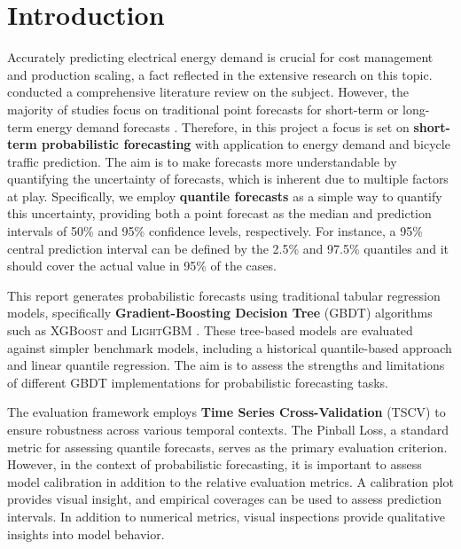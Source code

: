 \section{Introduction}
\label{ch:Introduction}

Accurately predicting electrical energy demand is crucial for cost management and production scaling, a fact reflected in the extensive research on this topic. \Cite{nti_electricity_2020} conducted a comprehensive literature review on the subject. However, the majority of studies focus on traditional point forecasts for short-term or long-term energy demand forecasts \parencite[915]{hong_probabilistic_2016}. Therefore, in this project a focus is set on \textbf{short-term probabilistic forecasting} with application to energy demand and bicycle traffic prediction. The aim is to make forecasts more understandable by quantifying the uncertainty of forecasts, which is inherent due to multiple factors at play. Specifically, we employ \textbf{quantile forecasts} as a simple way to quantify this uncertainty, providing both a point forecast as the median and prediction intervals of 50\% and 95\% confidence levels, respectively. For instance, a 95\% central prediction interval can be defined by the 2.5\% and 97.5\% quantiles and it should cover the actual value in 95\% of the cases.

This report generates probabilistic forecasts using traditional tabular regression models, specifically \textbf{Gradient-Boosting Decision Tree} (GBDT) algorithms such as \textsc{XGBoost} \parencite{chen_xgboost_2016} and \textsc{LightGBM} \parencite{ke_lightgbm_2017}. These tree-based models are evaluated against simpler benchmark models, including a historical quantile-based approach and linear quantile regression. The aim is to assess the strengths and limitations of different GBDT implementations for probabilistic forecasting tasks.

The evaluation framework employs \textbf{Time Series Cross-Validation} (TSCV) to ensure robustness across various temporal contexts. The Pinball Loss, a standard metric for assessing quantile forecasts, serves as the primary evaluation criterion. However, in the context of probabilistic forecasting, it is important to assess model calibration in addition to the relative evaluation metrics. A calibration plot provides visual insight, and empirical coverages can be used to assess prediction intervals.
In addition to numerical metrics, visual inspections provide qualitative insights into model behavior.

